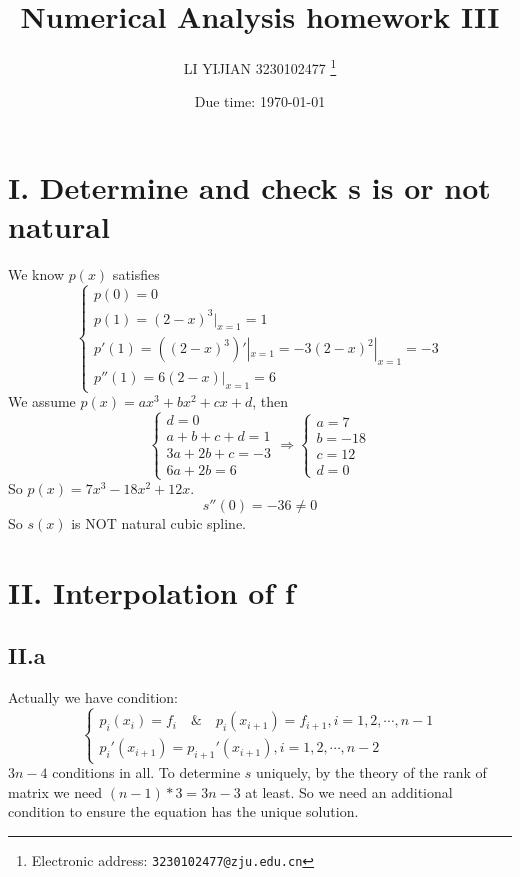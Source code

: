\documentclass[a4paper]{article}
\begin{document}
\title{Numerical Analysis homework III}

\author{LI YIJIAN 3230102477
  \thanks{Electronic address: \texttt{3230102477@zju.edu.cn}}}


\date{Due time: \today}
\maketitle





\section*{I. Determine and check s is or not natural}
We know $p(x)$ satisfies 
\[
\begin{cases}
p(0) = 0 \\
p(1) = (2-x)^3|_{x=1} = 1 \\
p'(1) = ((2-x)^3)'|_{x=1} = -3(2-x)^2|_{x=1} = -3 \\
p''(1) = 6(2-x)|_{x=1} = 6
\end{cases}
\]
We assume $p(x) = ax^3 + bx^2 + cx + d$, then 
\[
\begin{cases}
d = 0 \\
a+b+c+d= 1 \\
3a+2b+c = -3 \\
6a+2b = 6
\end{cases}
\Rightarrow
\begin{cases}
a = 7 \\
b = -18 \\
c = 12 \\
d = 0
\end{cases}
\]
So $p(x) = 7x^3 - 18x^2 + 12x$.
\[
s''(0) = -36 \neq 0
\]
So $s(x)$ is NOT natural cubic spline.


\section*{II. Interpolation of f}
\subsection*{II.a}
Actually we have condition:
\[
\begin{cases}
p_i(x_i) = f_i \quad \& \quad p_i(x_{i+1}) = f_{i+1} ,i= 1 ,2 ,\cdots, n-1 \\
p_i'(x_{i+1}) = p_{i+1}'(x_{i+1}), i= 1 ,2, \cdots ,n-2
\end{cases}
\]
$3n-4$ conditions in all. To determine $s$ uniquely, by the theory of the rank of matrix  we need $(n-1)*3 = 3n-3$ at least.
So we need an additional condition to ensure the equation has the unique solution.
\end{document}
